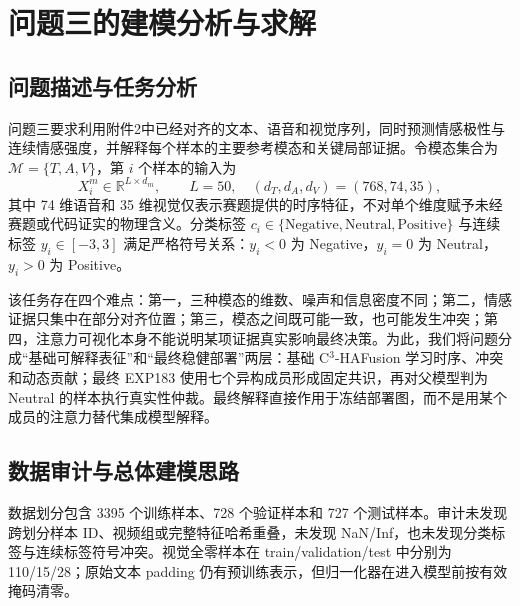 
\section{问题三的建模分析与求解}
\label{sec:q3}

\subsection{问题描述与任务分析}

问题三要求利用附件2中已经对齐的文本、语音和视觉序列，同时预测情感极性与连续情感强度，并解释每个样本的主要参考模态和关键局部证据。令模态集合为
\(\mathcal M=\{T,A,V\}\)，第 \(i\) 个样本的输入为
\begin{equation}
X_i^m\in\mathbb R^{L\times d_m},\qquad
L=50,\quad (d_T,d_A,d_V)=(768,74,35),
\label{eq:q3_input}
\end{equation}
其中 74 维语音和 35 维视觉仅表示赛题提供的时序特征，不对单个维度赋予未经赛题或代码证实的物理含义。分类标签
\(c_i\in\{\mathrm{Negative},\mathrm{Neutral},\mathrm{Positive}\}\) 与连续标签 \(y_i\in[-3,3]\) 满足严格符号关系：\(y_i<0\) 为 Negative，\(y_i=0\) 为 Neutral，\(y_i>0\) 为 Positive。

该任务存在四个难点：第一，三种模态的维数、噪声和信息密度不同；第二，情感证据只集中在部分对齐位置；第三，模态之间既可能一致，也可能发生冲突；第四，注意力可视化本身不能说明某项证据真实影响最终决策。为此，我们将问题分成“基础可解释表征”和“最终稳健部署”两层：基础 C$^3$-HAFusion 学习时序、冲突和动态贡献；最终 EXP183 使用七个异构成员形成固定共识，再对父模型判为 Neutral 的样本执行真实性仲裁。最终解释直接作用于冻结部署图，而不是用某个成员的注意力替代集成模型解释。



\subsection{数据审计与总体建模思路}

数据划分包含 3395 个训练样本、728 个验证样本和 727 个测试样本。审计未发现跨划分样本 ID、视频组或完整特征哈希重叠，未发现 NaN/Inf，也未发现分类标签与连续标签符号冲突。视觉全零样本在 train/validation/test 中分别为 110/15/28；原始文本 padding 仍有预训练表示，但归一化器在进入模型前按有效掩码清零。




